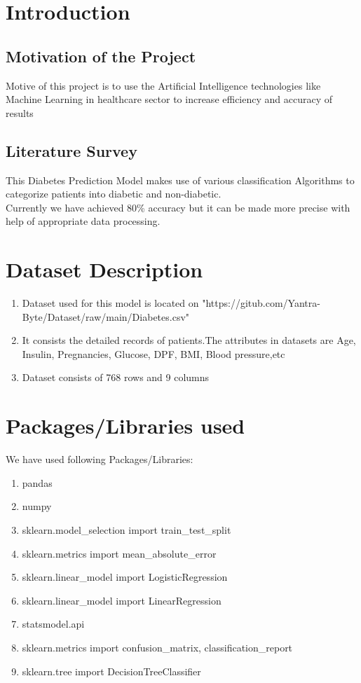 \documentclass[pdftex,a4paper,11pt,oneside,openright]{report}
\begin{document}
\chapter{Introduction}
\section{Motivation of the Project}
\Large{Motive of this project is to use the Artificial Intelligence technologies like Machine Learning in healthcare sector to increase efficiency and accuracy of results }
\section{Literature Survey}
\Large{This Diabetes Prediction Model makes use of various classification Algorithms to categorize patients into diabetic and non-diabetic.}\\
\Large{Currently we have achieved 80\% accuracy but it can be made more precise with help of appropriate data processing.}

\chapter{Dataset Description}
\begin{enumerate}
    \item Dataset used for this model is located on "https://gitub.com/Yantra-Byte/Dataset/raw/main/Diabetes.csv" 
    \item It consists the detailed records of patients.The attributes in datasets are Age, Insulin, Pregnancies, Glucose, DPF, BMI, Blood pressure,etc
    \item Dataset consists of 768 rows and 9 columns
    
\end{enumerate}

\chapter{Packages/Libraries used}
We have used following Packages/Libraries:
\Large{
\begin{enumerate}
    \item pandas
    \item numpy
    \item sklearn.model\_selection import train\_test\_split
    \item sklearn.metrics import mean\_absolute\_error
    \item sklearn.linear\_model import LogisticRegression
    \item sklearn.linear\_model import LinearRegression
    \item statsmodel.api
    \item sklearn.metrics import confusion\_matrix, classification\_report
    \item sklearn.tree import DecisionTreeClassifier
\end{enumerate}
}
\end{document}
